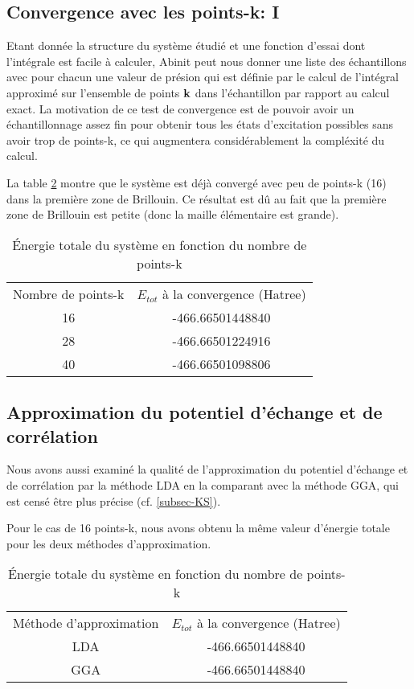 \subsection{Convergence avec les points-k: I}
Etant donnée la structure du système étudié et une fonction d'essai dont l'intégrale est facile à calculer,
Abinit peut nous donner une liste des échantillons avec pour chacun une valeur de présion
qui est définie par le calcul de l'intégral approximé sur l'ensemble de points $\vb{k}$ dans l'échantillon
par rapport au calcul exact.
La motivation de ce test de convergence est de pouvoir avoir un échantillonnage assez fin pour obtenir tous les états d'excitation possibles sans avoir trop de points-k, ce qui augmentera considérablement la compléxité du calcul.

La table \cref{etotPK} montre que le système est déjà convergé avec peu de points-k (16) dans la première zone de Brillouin.
Ce résultat est dû au fait que la première zone de Brillouin est petite (donc la maille élémentaire est grande).
\begin{table}[ht]\label{etotPK}
\caption{Énergie totale du système en fonction du nombre de points-k}
\centering
\begin{tabular}{c c}
\hline

Nombre de points-k  &  $E_{tot}$ à la convergence (Hatree)
\\
16    &  -466.66501448840
\\
28    &  -466.66501224916
\\
40    &  -466.66501098806
\end{tabular}
\end{table}

\subsection{Approximation du potentiel d'échange et de corrélation}
Nous avons aussi examiné la qualité de l'approximation du potentiel d'échange et de corrélation par la méthode LDA en la comparant avec la méthode GGA, qui est censé être plus précise (cf. \cref{subsec-KS}).

Pour le cas de 16 points-k, nous avons obtenu la même valeur d'énergie totale pour les deux méthodes d'approximation.

\begin{table}[ht]\label{etotPK}
\caption{Énergie totale du système en fonction du nombre de points-k}
\centering
\begin{tabular}{c c}
\hline

Méthode d'approximation &  $E_{tot}$ à la convergence (Hatree)
\\
LDA    &  -466.66501448840
\\
GGA   &   -466.66501448840
\end{tabular}
\end{table}

